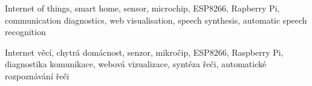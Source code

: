 
    
    
    



    
\begin{keywords_en}
    \vspace{1cm}
    
    Internet of things, smart home, sensor, microchip, ESP8266, Rapberry Pi, communication diagnostics, web visualisation, speech synthesis, automatic speech recognition
    
    \vspace{1cm}
\end{keywords_en}

\begin{keywords_cs}
    \vspace{1cm}
    
    Internet věcí, chytrá domácnost, senzor, mikročip, ESP8266, Raspberry Pi, diagnostika komunikace, webová vizualizace, syntéza řeči, automatické rozpoznávání řeči

\end{keywords_cs}